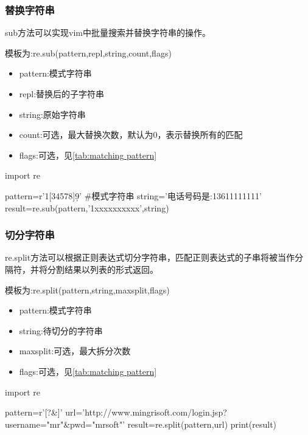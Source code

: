 \documentclass{article}
\begin{document}
      \subsubsection{替换字符串}
        sub方法可以实现vim中批量搜索并替换字符串的操作。

        模板为:re.sub(pattern,repl,string,count,flags)
        \begin{itemize}
          \item pattern:模式字符串
          \item repl:替换后的子字符串
          \item string:原始字符串
          \item count:可选，最大替换次数，默认为0，表示替换所有的匹配
          \item flags:可选，见\autoref{tab:matching pattern}
        \end{itemize}

        \begin{codeblock}[language=python, caption={string substitution}]
          import re

          pattern=r'1[34578]\d{9}' #模式字符串
          string='电话号码是:13611111111'
          result=re.sub(pattern,'1xxxxxxxxxx',string)
        \end{codeblock}

      \subsubsection{切分字符串}
        re.split方法可以根据正则表达式切分字符串，匹配正则表达式的子串将被当作分隔符，并将分割结果以列表的形式返回。

        模板为:re.split(pattern,string,\lbrack maxsplit\rbrack,\lbrack flags\rbrack)
        \begin{itemize}
          \item pattern:模式字符串
          \item string:待切分的字符串
          \item maxsplit:可选，最大拆分次数
          \item flags:可选，见\autoref{tab:matching pattern}
        \end{itemize}
        \begin{codeblock}[language=python, caption={string segmentation}]
          import re

          pattern=r'[?&]'
          url='http://www.mingrisoft.com/login.jsp?username="mr"&pwd="mrsoft"'
          result=re.split(pattern,url)
          print(result)
        \end{codeblock}
\end{document}
